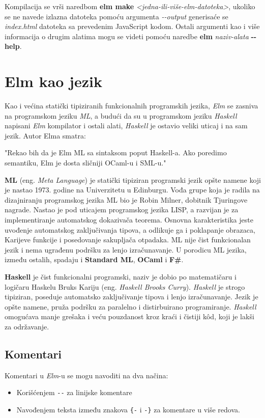 \documentclass[12pt,oneside]{memoir}
\begin{document}
Kompilacija se vrši naredbom \textbf{elm make} \emph{<jedna-ili-više-elm-datoteka>},
ukoliko se ne navede izlazna datoteka pomoću argumenta \emph{-{}-output} generisaće 
se \emph{index.html} datoteka sa prevedenim JavaScript kodom. Ostali argumenti kao i
više informacija o drugim alatima mogu se videti pomoću naredbe \textbf{elm} 
\emph{naziv-alata} \textbf{-{}-help}.

\section{Elm kao jezik}
Kao i većina statički tipiziranih funkcionalnih programskih jezika, \emph{Elm} se zasniva na
programskom jeziku \emph{ML}, a budući da su u programskom jeziku \emph{Haskell} napisani \emph{Elm} kompilator
i ostali alati, \emph{Haskell} je ostavio veliki uticaj i na sam jezik. Autor Elma smatra:
\begin{displayquote}
"Rekao bih da je Elm ML sa sintaksom poput Haskell-a. Ako poredimo semantiku, Elm je
dosta sličniji OCaml-u i SML-u." \cite{eczaplicki:2015}
\end{displayquote}

\textbf{ML} (eng. \emph{Meta Language})\cite{ml} je statički tipiziran programski jezik opšte 
namene koji je nastao 1973. godine na Univerzitetu u Edinburgu. Vođa grupe koja je radila
na dizajniranju programskog jezika ML bio je Robin Milner, dobitnik Tjuringove nagrade.
Nastao je pod uticajem programskog jezika LISP, a razvijan je za implementiranje automatskog
dokazivača teorema. Osnovna karakteristika jeste uvođenje automatskog zaključivanja tipova, a
odlikuje ga i poklapanje obrazaca, Karijeve funkcije i posedovanje sakupljača otpadaka. ML
nije čist funkcionalan  jezik i nema ugrađenu podršku za lenjo izračunavanje. U porodicu ML 
jezika, između ostalih, spadaju i \textbf{Standard ML}, \textbf{OCaml} i \textbf{F{\#}}.


\textbf{Haskell}\cite{haskell} je čist funkcionalni programski, naziv je dobio po matematičaru i 
logičaru Haskelu Bruks Kariju (eng. \emph{Haskell Brooks Curry}). \emph{Haskell} je strogo 
tipiziran, poseduje automatsko zaključivanje tipova i lenjo izračunavanje. Jezik je 
opšte namene, pruža podršku za paralelno i distirbuirano programiranje. \emph{Haskell} 
omogućava manje grešaka i veću pouzdanost kroz kraći i čistiji k\^{o}d, koji je lakši za
održavanje. 


\subsection{Komentari}
Komentari u \emph{Elm}-u se mogu navoditi na dva načina: \begin{itemize}
  \item Korišćenjem \texttt{-{}-} za linijske komentare
  \item Navođenjem teksta između znakova \texttt{\{-} i \texttt{-\}} za komentare u više redova.    
\end{itemize}
\end{document}
